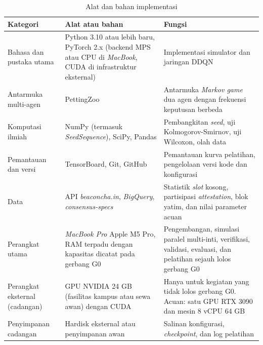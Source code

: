 \begin{table}[htbp]
\centering
\caption{Alat dan bahan implementasi}
\label{tab:alat_bahan}
\small
\begin{tabular}{|p{2.3cm}|p{4.4cm}|p{5.5cm}|}
\hline
\textbf{Kategori} & \textbf{Alat atau bahan} & \textbf{Fungsi} \\
\hline
Bahasa dan pustaka utama & Python 3.10 atau lebih baru, PyTorch 2.x (backend MPS atau CPU di \textit{MacBook}, CUDA di infrastruktur eksternal) & Implementasi simulator dan jaringan DDQN \\
\hline
Antarmuka multi-agen & PettingZoo & Antarmuka \textit{Markov game} dua agen dengan frekuensi keputusan berbeda \\
\hline
Komputasi ilmiah & NumPy (termasuk \textit{SeedSequence}), SciPy, Pandas & Pembangkitan \textit{seed}, uji Kolmogorov-Smirnov, uji Wilcoxon, olah data \\
\hline
Pemantauan dan versi & TensorBoard, Git, GitHub & Pemantauan kurva pelatihan, pengelolaan versi kode dan konfigurasi \\
\hline
Data & API \textit{beaconcha.in}, \textit{BigQuery}, \textit{consensus-specs} & Statistik \textit{slot} kosong, partisipasi \textit{attestation}, blok yatim, dan nilai parameter acuan \\
\hline
Perangkat utama & \textit{MacBook Pro} Apple M5 Pro, RAM terpadu dengan kapasitas dicatat pada gerbang G0 & Pengembangan, simulasi paralel multi-inti, verifikasi, validasi, evaluasi, dan pelatihan sejauh lolos gerbang G0 \\
\hline
Perangkat eksternal (cadangan) & GPU NVIDIA 24 GB (fasilitas kampus atau sewa awan) dengan CUDA & Hanya untuk kegiatan yang tidak lolos gerbang G0. Acuan: satu GPU RTX 3090 \parencite{skowronski2026adaptive} dan mesin 8 vCPU 64 GB \parencite{laneve2025stochastic} \\
\hline
Penyimpanan cadangan & Hardisk eksternal atau penyimpanan awan & Salinan konfigurasi, \textit{checkpoint}, dan log pelatihan \\
\hline
\end{tabular}
\end{table}

